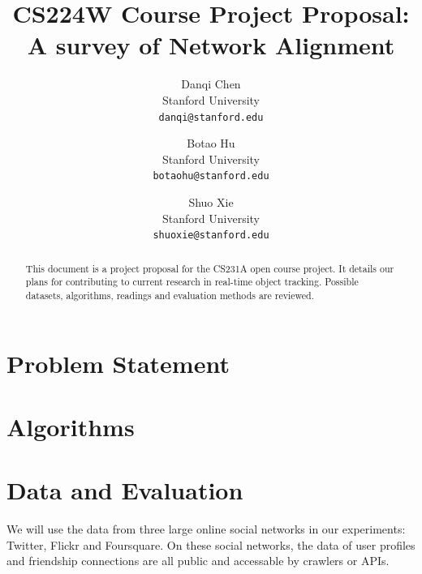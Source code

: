 \documentclass[11pt,letterpaper]{article}
\begin{document}
\title{CS224W Course Project Proposal: A survey of Network Alignment}

\author{Danqi Chen\\
Stanford University\\
{\tt\small danqi@stanford.edu}
\and
Botao Hu\\
Stanford University\\
{\tt\small botaohu@stanford.edu}
%
\and
Shuo Xie\\
Stanford University\\
{\tt\small shuoxie@stanford.edu}
}

\maketitle
\thispagestyle{empty}

\maketitle

\begin{abstract}
   This document is a project proposal for the CS231A open course project. It details our plans for contributing to current research in real-time object tracking. Possible datasets, algorithms, readings  and evaluation methods are reviewed.
\end{abstract}

\section{Problem Statement}

\section{Algorithms}

\section{Data and Evaluation}

We will use the data from three large online social networks in our experiments: Twitter, Flickr and Foursquare. On these social networks, the data of user profiles and friendship connections are all public and accessable by crawlers or APIs. 
\end{document}
